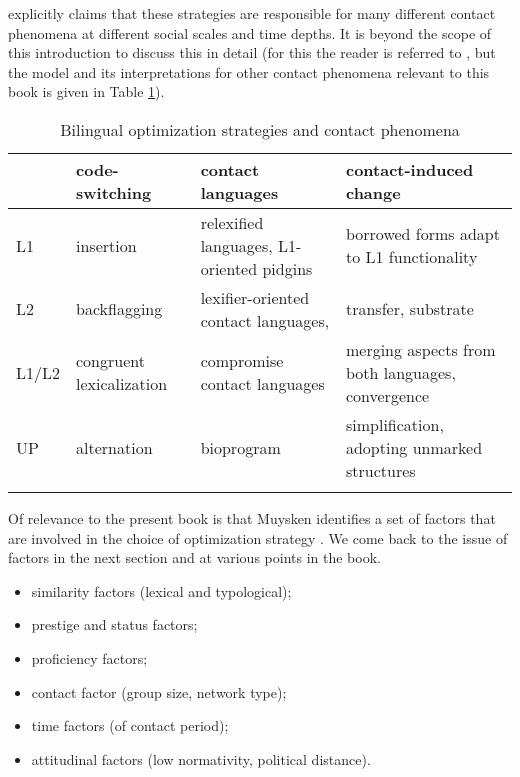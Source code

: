 \cite{muysken2013language} explicitly claims that these strategies are responsible for many different contact phenomena at different social scales and time depths. It is beyond the scope of this introduction to discuss this in detail (for this the reader is referred to \citealt{muysken2013language}, but the model and its interpretations for other contact phenomena relevant to this book is given in Table \ref{tab-muysken}).

\begin{table}
\caption{Bilingual optimization strategies and contact phenomena}  
\label{tab-muysken}
 \begin{tabular}{p{1cm} p{2.5cm} p{3cm} p{4cm}} 
  \lsptoprule
 & code-switching & contact languages & contact-induced change \\ 
  \midrule
  L1 & insertion & relexified languages, L1-oriented pidgins & borrowed forms adapt to L1 functionality \\
  L2 & backflagging & lexifier-oriented contact languages,  & transfer, substrate\\
  L1/L2 & congruent lexicalization & compromise contact languages & merging aspects from both languages, convergence\\
  UP & alternation & bioprogram & simplification, adopting unmarked structures\\
   \lspbottomrule
 \end{tabular}
\end{table}

Of relevance to the present book is that Muysken identifies a set of factors that are involved in the choice of optimization strategy \citep[726]{muysken2013language}. We come back to the issue of factors in the next section and at various points in the book.

\begin{itemize}
\itemsep-0.4em 
    \item similarity factors (lexical and typological);
    \item prestige and status factors;
    \item proficiency factors;
     \item contact factor (group size, network type);
    \item time factors (of contact period);
    \item attitudinal factors (low normativity, political
distance).
\end{itemize}



